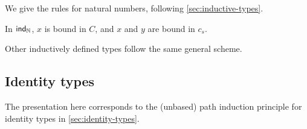 We give the rules for natural numbers, following \autoref{sec:inductive-types}.

%
In $\mathsf{ind}_{\mathbb{N}}$, $x$ is bound in $C$, and $x$ and $y$ are bound in $c_s$.

Other inductively defined types follow the same general scheme.

\subsection{Identity types}

%

The presentation here corresponds to the (unbased) path induction principle for identity types in
\autoref{sec:identity-types}.

